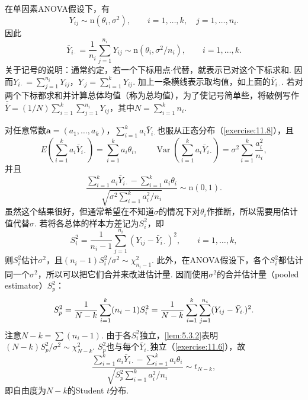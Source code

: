 在单因素ANOVA假设下，有
$$Y_{ij}\sim\mathrm n(\theta_i,\sigma^2),\qquad i=1,\ldots,k,\quad j=1,\ldots,n_i.$$
因此
$$\bar Y_{i\cdot}=\frac1{n_i}\sum_{j=1}^{n_i}Y_{ij}\sim\mathrm n(\theta_i,\sigma^2/n_i),\qquad i=1,\ldots,k.$$
关于记号的说明：通常约定，若一个下标用点$\cdot$代替，就表示已对这个下标求和. 因而$Y_{i\cdot}=\sum_{j=1}^{n_i}Y_{ij}$，$Y_{\cdot j}=\sum_{i=1}^kY_{ij}$. 加上一条横线表示取均值，如上面的$\bar Y_{i\cdot}$. 若对两个下标都求和并计算总体均值（称为总均值），为了使记号简单些，将破例写作$\bar{\bar Y}=(1/N)\sum_{i=1}^k\sum_{j=1}^{n_i}Y_{ij}$，其中$N=\sum_{i=1}^kn_i$.

对任意常数$\boldsymbol a=(a_1,\ldots,a_k)$，$\sum_{i=1}^ka_i\bar Y_{i\cdot}$也服从正态分布（\autoref{exercise:11.8}），且
$$
E\left(\sum_{i=1}^ka_i\bar Y_{i\cdot}\right)=\sum_{i=1}^ka_i\theta_i,
\qquad
\operatorname{Var}\left(\sum_{i=1}^ka_i\bar Y_{i\cdot}\right)=\sigma^2\sum_{i=1}^k\frac{a_i^2}{n_i},
$$
并且
$$
\frac{\sum_{i=1}^ka_i\bar Y_{i\cdot}-\sum_{i=1}^ka_i\theta_i}
{\sqrt{\sigma^2\sum_{i=1}^ka_i^2/n_i}}\sim\mathrm n(0,1).
$$
虽然这个结果很好，但通常希望在不知道$\sigma$的情况下对$\theta_i$作推断，所以需要用估计值代替$\sigma$. 若将各总体的样本方差记为$S_i^2$，即
$$S_i^2=\frac1{n_i-1}\sum_{j=1}^{n_i}(Y_{ij}-\bar Y_{i\cdot})^2,\qquad i=1,\ldots,k,$$
则$S_i^2$估计$\sigma^2$，且$(n_i-1)S_i^2/\sigma^2\sim\chi^2_{n_i-1}$. 此外，在ANOVA假设下，各个$S_i^2$都估计同一个$\sigma^2$，所以可以把它们合并来改进估计量. 因而使用$\sigma^2$的合并估计量（pooled estimator）$S_p^2$：
\begin{equation}\label{eq:11.2.5}\index{SI0057@方差估计量}
S_p^2=\frac1{N-k}\sum_{i=1}^k(n_i-1)S_i^2
=\frac1{N-k}\sum_{i=1}^k\sum_{j=1}^{n_i}(Y_{ij}-\bar Y_{i\cdot})^2.
\end{equation}
注意$N-k=\sum(n_i-1)$. 由于各$S_i^2$独立，\autoref{lem:5.3.2}表明$(N-k)S_p^2/\sigma^2\sim\chi^2_{N-k}$. $S_p^2$也与每个$\bar Y_{i\cdot}$独立（\autoref{exercise:11.6}），故
\begin{equation}\label{eq:11.2.6}
\frac{\sum_{i=1}^ka_i\bar Y_{i\cdot}-\sum_{i=1}^ka_i\theta_i}{\sqrt{S_p^2\sum_{i=1}^ka_i^2/n_i}}\sim t_{N-k},
\end{equation}
即自由度为$N-k$的Student $t$分布.

